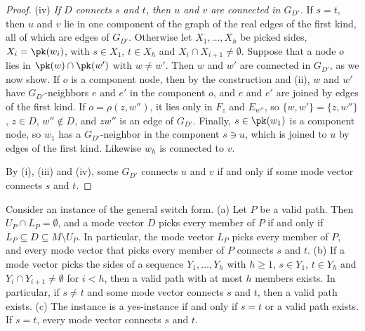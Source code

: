 \begin{proof}
(iv) \emph{If $D$ connects $s$ and $t$, then $u$ and $v$ are connected in $G_{D'}$.}
If $s = t$, then $u$ and $v$ lie in one component of the graph of the real edges of the first kind, all of which are edges of $G_{D'}$.
Otherwise let $X_1, \dots, X_h$ be picked sides, $X_i = \pk(w_i)$, with $s \in X_1$, $t \in X_h$ and $X_i \cap X_{i+1} \neq \emptyset$.
Suppose that a node $o$ lies in $\pk(w) \cap \pk(w')$ with $w \neq w'$.
Then $w$ and $w'$ are connected in $G_{D'}$, as we now show.
If $o$ is a component node, then by the construction and (ii), $w$ and $w'$ have $G_{D'}$-neighbors $e$ and $e'$ in the component $o$, and $e$ and $e'$ are joined by edges of the first kind.
If $o = \rho(z, w'')$, it lies only in $F_z$ and $E_{w''}$, so $\{w, w'\} = \{z, w''\}$, $z \in D$, $w'' \notin D$, and $zw''$ is an edge of $G_{D'}$.
Finally, $s \in \pk(w_1)$ is a component node, so $w_1$ has a $G_{D'}$-neighbor in the component $s \ni u$, which is joined to $u$ by edges of the first kind.
Likewise $w_h$ is connected to $v$.

By (i), (iii) and (iv), some $G_{D'}$ connects $u$ and $v$ if and only if some mode vector connects $s$ and $t$.
\end{proof}

\begin{lemma}
\label{lem:zz-valid}
Consider an instance of the general switch form.
(a) Let $P$ be a valid path.
Then $U_P \cap L_P = \emptyset$, and a mode vector $D$ picks every member of $P$ if and only if $L_P \subseteq D \subseteq M \setminus U_P$.
In particular, the mode vector $L_P$ picks every member of $P$, and every mode vector that picks every member of $P$ connects $s$ and $t$.
(b) If a mode vector picks the sides of a sequence $Y_1, \dots, Y_h$ with $h \geq 1$, $s \in Y_1$, $t \in Y_h$ and $Y_i \cap Y_{i+1} \neq \emptyset$ for $i < h$, then a valid path with at most $h$ members exists.
In particular, if $s \neq t$ and some mode vector connects $s$ and $t$, then a valid path exists.
(c) The instance is a yes-instance if and only if $s = t$ or a valid path exists.
If $s = t$, every mode vector connects $s$ and $t$.
\end{lemma}

